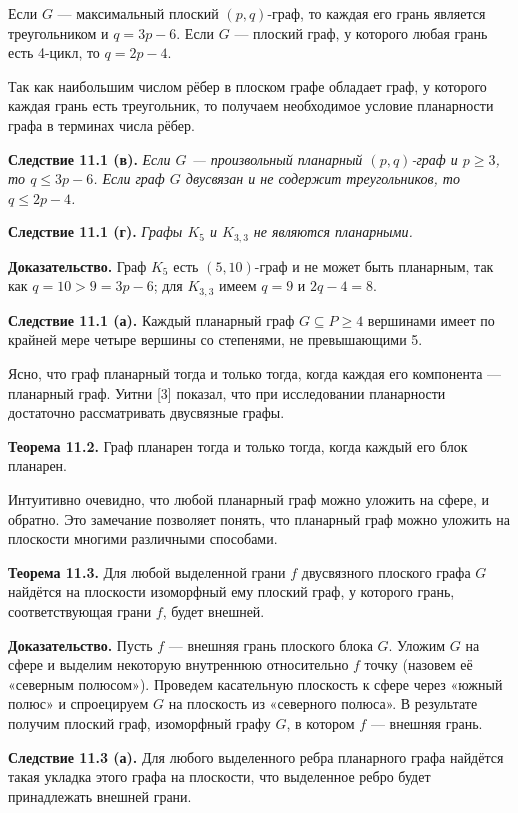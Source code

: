 \begin{corollary}[11.1 (б)] Если $G$ --- максимальный плоский $(p,q)$-граф, то каждая его грань является треугольником и $q=3p-6$. Если $G$ --- плоский граф, у которого любая грань есть 4-цикл, то $q=2p-4$. \end{corollary}

Так как наибольшим числом рёбер в плоском графе обладает граф, у которого каждая грань есть треугольник, то получаем необходимое условие планарности графа в терминах числа рёбер.

\textbf{Следствие 11.1 (в).} \textit{Если $G$ — произвольный планарный $(p, q)$-граф и $p \geq 3$, то $q \leq 3p - 6$. Если граф $G$ двусвязан и не содержит треугольников, то $q \leq 2p - 4$.}

\textbf{Следствие 11.1 (г).} \textit{Графы $K_5$ и $K_{3,3}$ не являются планарными.}

\textbf{Доказательство.} Граф $K_5$ есть $(5,10)$-граф и не может быть планарным, так как $q = 10 > 9 = 3p - 6$; для $K_{3,3}$ имеем $q = 9$ и $2q - 4 = 8$.

\textbf{Следствие 11.1 (а).} Каждый планарный граф $G \subseteq P \geq 4$ вершинами имеет по крайней мере четыре вершины со степенями, не превышающими 5.

Ясно, что граф планарный тогда и только тогда, когда каждая его компонента — планарный граф. Уитни [3] показал, что при исследовании планарности достаточно рассматривать двусвязные графы.

\textbf{Теорема 11.2.} Граф планарен тогда и только тогда, когда каждый его блок планарен.

Интуитивно очевидно, что любой планарный граф можно уложить на сфере, и обратно. Это замечание позволяет понять, что планарный граф можно уложить на плоскости многими различными способами.

\textbf{Теорема 11.3.} Для любой выделенной грани $f$ двусвязного плоского графа $G$ найдётся на плоскости изоморфный ему плоский граф, у которого грань, соответствующая грани $f$, будет внешней.

\textbf{Доказательство.} Пусть $f$ — внешняя грань плоского блока $G$. Уложим $G$ на сфере и выделим некоторую внутреннюю относительно $f$ точку (назовем её «северным полюсом»). Проведем касательную плоскость к сфере через «южный полюс» и спроецируем $G$ на плоскость из «северного полюса». В результате получим плоский граф, изоморфный графу $G$, в котором $f$ — внешняя грань.

\textbf{Следствие 11.3 (а).} Для любого выделенного ребра планарного графа найдётся такая укладка этого графа на плоскости, что выделенное ребро будет принадлежать внешней грани.

